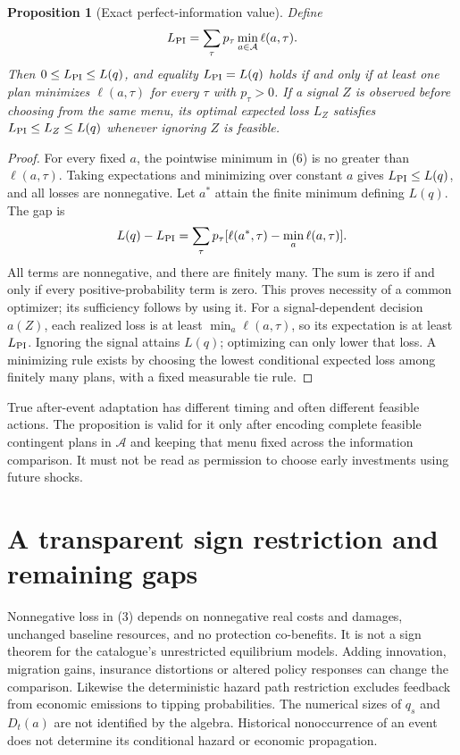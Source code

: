 \documentclass[11pt]{article}
\newtheorem{proposition}[theorem]{Proposition}
\begin{document}
\begin{proposition}[Exact perfect-information value]\label{info}
Define
\[
 L_{\rm PI}=\sum_\tau p_\tau\min_{a\in\mathcal A}\ell(a,\tau).
\]
Then $0\leq L_{\rm PI}\leq L(q)$, and equality $L_{\rm PI}=L(q)$ holds
if and only if at least one plan minimizes $\ell(a,\tau)$ for every
$\tau$ with $p_\tau>0$. If a signal $Z$ is observed before choosing from
the same menu, its optimal expected loss $L_Z$ satisfies
$L_{\rm PI}\leq L_Z\leq L(q)$ whenever ignoring $Z$ is feasible.
\end{proposition}
\begin{proof}
For every fixed $a$, the pointwise minimum in (6) is no greater than
$\ell(a,\tau)$. Taking expectations and minimizing over constant $a$
gives $L_{\rm PI}\leq L(q)$, and all losses are nonnegative.
Let $a^*$ attain the finite minimum defining $L(q)$. The gap is
\[
 L(q)-L_{\rm PI}=\sum_\tau p_\tau
       [\ell(a^*,\tau)-\min_a\ell(a,\tau)].
\]
All terms are nonnegative, and there are finitely many. The sum is zero
if and only if every positive-probability term is zero. This proves
necessity of a common optimizer; its sufficiency follows by using it.
For a signal-dependent decision $a(Z)$, each realized loss is at least
$\min_a\ell(a,\tau)$, so its expectation is at least $L_{\rm PI}$.
Ignoring the signal attains $L(q)$; optimizing can only lower that loss.
A minimizing rule exists by choosing the lowest conditional expected loss
among finitely many plans, with a fixed measurable tie rule.
\end{proof}
True after-event adaptation has different timing and often different
feasible actions. The proposition is valid for it only after encoding
complete feasible contingent plans in $\mathcal A$ and keeping that menu
fixed across the information comparison. It must not be read as permission
to choose early investments using future shocks.

\section{A transparent sign restriction and remaining gaps}
Nonnegative loss in (3) depends on nonnegative real costs and damages,
unchanged baseline resources, and no protection co-benefits. It is not a
sign theorem for the catalogue's unrestricted equilibrium models. Adding
innovation, migration gains, insurance distortions or altered policy
responses can change the comparison. Likewise the deterministic hazard
path restriction excludes feedback from economic emissions to tipping
probabilities. The numerical sizes of $q_s$ and $D_t(a)$ are not identified
by the algebra. Historical nonoccurrence of an event does not determine
its conditional hazard or economic propagation.
\end{document}
